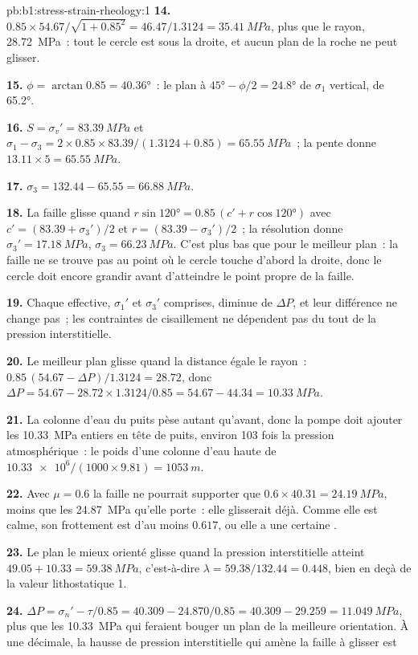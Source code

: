 \begin{solution}{pb:b1:stress-strain-rheology:1}
\textbf{14.} $0.85\times54.67/\sqrt{1 + 0.85^2} = 46.47/1.3124 =
\qty{35.41}{MPa}$, plus que le rayon, \qty{28.72}{MPa}~: tout le cercle
est sous la droite, et aucun plan de la roche ne peut glisser.

\textbf{15.} $\phi = \arctan0.85 = \ang{40.36}$~: le plan à
$\ang{45} - \phi/2 = \ang{24.8}$ de $\sigma_1$ vertical, de 
\ang{65.2}.

\textbf{16.} $S = \sigma_v' = \qty{83.39}{MPa}$ et
$\sigma_1 - \sigma_3 = 2\times0.85\times83.39/(1.3124 + 0.85) =
\qty{65.55}{MPa}$~; la pente donne $13.11\times5 = \qty{65.55}{MPa}$.

\textbf{17.} $\sigma_3 = 132.44 - 65.55 = \qty{66.88}{MPa}$.

\textbf{18.} La faille glisse quand
$r\sin\ang{120} = 0.85\,(c' + r\cos\ang{120})$ avec
$c' = (83.39 + \sigma_3')/2$ et $r = (83.39 - \sigma_3')/2$~; la résolution donne
$\sigma_3' = \qty{17.18}{MPa}$, $\sigma_3 = \qty{66.23}{MPa}$. C'est plus bas
que pour le meilleur plan~: la faille ne se trouve pas au point où le cercle
touche d'abord la droite, donc le cercle doit encore grandir avant d'atteindre
le point propre de la faille.

\textbf{19.} Chaque  effective, $\sigma_1'$ et $\sigma_3'$
comprises, diminue de $\Delta P$, et leur différence ne change pas~; les
contraintes de cisaillement ne dépendent pas du tout de la pression interstitielle.

\textbf{20.} Le meilleur plan glisse quand la distance égale le rayon~:
$0.85\,(54.67 - \Delta P)/1.3124 = 28.72$, donc
$\Delta P = 54.67 - 28.72\times1.3124/0.85 = 54.67 - 44.34 = \qty{10.33}{MPa}$.

\textbf{21.} La colonne d'eau du puits pèse autant qu'avant, donc la
pompe doit ajouter les \qty{10.33}{MPa} entiers en tête de puits, environ 103 fois
la pression atmosphérique~: le poids d'une colonne d'eau
haute de $\num{10.33e6}/(1000\times9.81) = \qty{1053}{m}$.

\textbf{22.} Avec $\mu = 0.6$ la faille ne pourrait supporter que
$0.6\times40.31 = \qty{24.19}{MPa}$, moins que les \qty{24.87}{MPa} qu'elle
porte~: elle glisserait déjà. Comme elle est calme, son frottement est d'au
moins $0.617$, ou elle a une certaine .

\textbf{23.} Le plan le mieux orienté glisse quand la pression interstitielle atteint
$49.05 + 10.33 = \qty{59.38}{MPa}$, c'est-à-dire $\lambda = 59.38/132.44 = 0.448$,
bien en deçà de la valeur lithostatique 1.

\textbf{24.} $\Delta P = \sigma_n' - \tau/0.85 = 40.309 - 24.870/0.85 = 40.309 -
29.259 = \qty{11.049}{MPa}$, plus que les \qty{10.33}{MPa} qui feraient bouger un
plan de la meilleure orientation. À une décimale, la hausse de pression interstitielle qui
amène la faille à glisser est
\end{solution}
